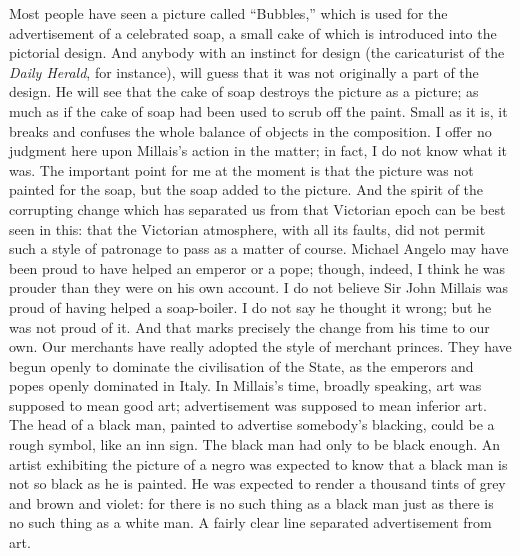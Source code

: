 \documentclass{book}
\begin{document}
Most people have seen a picture called “Bubbles,” which is used for the advertisement of a celebrated soap, a small cake of which is introduced into the pictorial design. And anybody with an instinct for design (the caricaturist of the \emph{Daily Herald}, for instance), will guess that it was not originally a part of the design. He will see that the cake of soap destroys the picture as a picture; as much as if the cake of soap had been used to scrub off the paint. Small as it is, it breaks and confuses the whole balance of objects in the composition. I offer no judgment here upon Millais’s action in the matter; in fact, I do not know what it was. The important point for me at the moment is that the picture was not painted for the soap, but the soap added to the picture. And the spirit of the corrupting change which has separated us from that Victorian epoch can be best seen in this: that the Victorian atmosphere, with all its faults, did not permit such a style of patronage to pass as a matter of course. Michael Angelo may have been proud to have helped an emperor or a pope; though, indeed, I think he was prouder than they were on his own account. I do not believe Sir John Millais was proud of having helped a soap-boiler. I do not say he thought it wrong; but he was not proud of it. And that marks precisely the change from his time to our own. Our merchants have really adopted the style of merchant princes. They have begun openly to dominate the civilisation of the State, as the emperors and popes openly dominated in Italy. In Millais’s time, broadly speaking, art was supposed to mean good art; advertisement was supposed to mean inferior art. The head of a black man, painted to advertise somebody’s blacking, could be a rough symbol, like an inn sign. The black man had only to be black enough. An artist exhibiting the picture of a negro was expected to know that a black man is not so black as he is painted. He was expected to render a thousand tints of grey and brown and violet: for there is no such thing as a black man just as there is no such thing as a white man. A fairly clear line separated advertisement from art.
\end{document}
